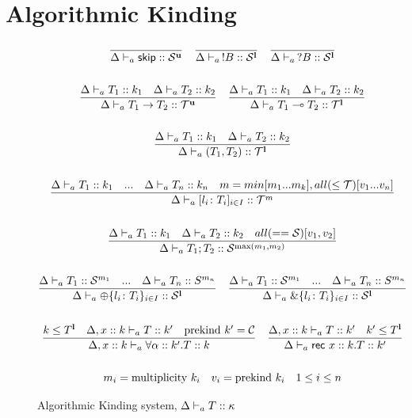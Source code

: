 \documentclass[12pt,openright,twoside]{report}
\begin{document}
\section{Algorithmic Kinding} 
\begin{figure}[ht]
\centering
  \begin{gather*}
	\frac{}{\Delta \vdash_{a} \mathsf{skip} :: \mathcal S^{\mathbf{u}}} \quad
	\frac{}{\Delta \vdash_{a} \,!B :: \mathcal S^{\mathbf{l}}} \quad \frac{}{\Delta
			\vdash_{a} \,?B :: \mathcal S^{\mathbf{l}}}
    \\\\
    \frac{\Delta \vdash_{a} T_1 :: k_1 \quad \Delta \vdash_{a} T_2 :: k_2}
    	{\Delta \vdash_{a} T_1 \to T_2 :: \mathcal T^{\mathbf{u}}} \quad
    \frac{\Delta \vdash_{a} T_1 :: k_1 \quad \Delta \vdash_{a} T_2 :: k_2}
    	{\Delta \vdash_{a} T_1 \multimap T_2 :: \mathcal T^{\mathbf{l}}}	
    \\
    \\
    \frac{\Delta \vdash_{a} T_1 :: k_1 \quad \Delta \vdash_{a} T_2 :: k_2}
    	{\Delta \vdash_{a} (T_1,T_2) :: \mathcal T^{\mathbf{l}}}	
    \\
    \\	
    \frac{\Delta \vdash_{a} T_1 :: k_1 \quad...\quad \Delta \vdash_{a} T_n :: k_n \quad 
    		m=min[m_1 ... m_k], all(\le \mathcal T)[v_1 ... v_n]}
    	{\Delta \vdash_{a} [l_i\colon T_i]_{i\in I} :: \mathcal T^m}	
	\\
	\\
	\frac{\Delta \vdash_{a} T_1 :: k_1 \quad \Delta \vdash_{a} T_2 :: k_2 \quad all(== \mathcal S)[v_1,v_2]}
    	{\Delta \vdash_{a} T_1;T_2 :: \mathcal S^{\max(m_1, m_2)}}	    
	\\	
	\\
		\frac{\Delta \vdash_{a} T_1 :: \mathcal S^{m_1} \quad \mbox{...} \quad \Delta \vdash_{a} T_n :: S^{m_n}}{
      \Delta \vdash_{a} \oplus\{l_i\colon T_i\}_{i\in I} :: \mathcal S^{\mathbf{l}}}
    \quad
    \frac{\Delta \vdash_{a} T_1 :: \mathcal S^{m_1} \quad \mbox{...} \quad \Delta \vdash_{a} T_n :: S^{m_n}}
    { \Delta \vdash_{a} \&\{l_i\colon T_i\}_{i\in I} :: \mathcal S^{\mathbf{l}}}
	\\		
	\\
	 \frac{k \le T^{\mathbf{l}} \quad \Delta, x :: k \vdash_{a} T :: k' \quad \mbox{prekind } k' = \mathcal C}
    { \Delta, x :: k \vdash_{a} \forall \alpha :: k'.T :: k}
	\quad
	\frac{\Delta, x :: k \vdash_{a} T :: k' \quad k' \le T^{\mathbf{l}}}
	    { \Delta \vdash_{a} \mathsf{rec} \mbox{ } x :: k.T :: k'}
	\\
	 \\	
	m_i = \mbox{multiplicity } k_i \quad v_i = \mbox{prekind } k_i \quad 1 \le i \le n 
	\end{gather*}
  \caption{Algorithmic Kinding system, $\Delta \vdash_{a} T :: \kappa$}
  \label{fig:kinding}
\end{figure}
%



\end{document}
